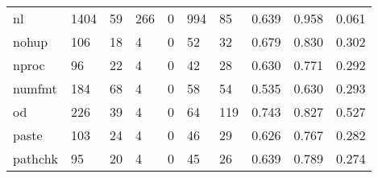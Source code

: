 \begin{longtable}{lp{1.3cm}p{1.3cm}p{1.3cm}p{1.3cm}p{1.3cm}p{1.3cm}p{1.3cm}p{1.3cm}p{1.3cm}}
nl        &                   1404 &                                 59 &                               266 &                                0 &                               994 &                              85 &                                0.639 &                                  0.958 &                                0.061 \\
nohup     &                    106 &                                 18 &                                 4 &                                0 &                                52 &                              32 &                                0.679 &                                  0.830 &                                0.302 \\
nproc     &                     96 &                                 22 &                                 4 &                                0 &                                42 &                              28 &                                0.630 &                                  0.771 &                                0.292 \\
numfmt    &                    184 &                                 68 &                                 4 &                                0 &                                58 &                              54 &                                0.535 &                                  0.630 &                                0.293 \\
od        &                    226 &                                 39 &                                 4 &                                0 &                                64 &                             119 &                                0.743 &                                  0.827 &                                0.527 \\
paste     &                    103 &                                 24 &                                 4 &                                0 &                                46 &                              29 &                                0.626 &                                  0.767 &                                0.282 \\
pathchk   &                     95 &                                 20 &                                 4 &                                0 &                                45 &                              26 &                                0.639 &                                  0.789 &                                0.274 \\

\end{longtable}
